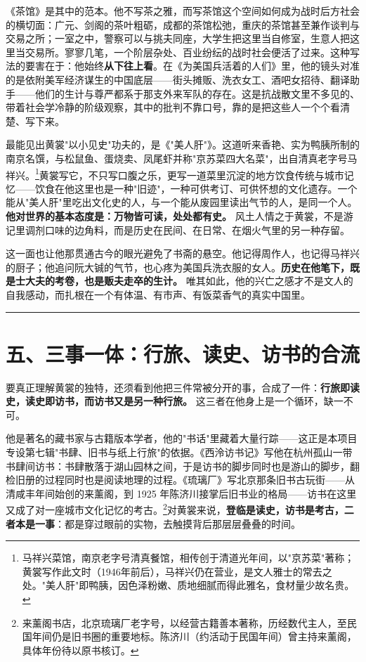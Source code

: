 \documentclass[UTF8,fontset=none,zihao=-4,a4paper]{ctexart}
\begin{document}
《茶馆》是其中的范本。他不写茶之雅，而写茶馆这个空间如何成为战时后方社会的横切面：广元、剑阁的茶叶粗砺，成都的茶馆松弛，重庆的茶馆甚至兼作谈判与交易之所；一室之中，警察可以与挑夫同座，大学生把这里当自修室，生意人把这里当交易所。寥寥几笔，一个阶层杂处、百业纷纭的战时社会便活了过来。这种写法的要害在于：他始终\textbf{从下往上看}。在《为美国兵活着的人们》里，他的镜头对准的是依附美军经济谋生的中国底层——街头摊贩、洗衣女工、酒吧女招待、翻译助手——他们的生计与尊严都系于那支外来军队的存在。这是抗战散文里不多见的、带着社会学冷静的阶级观察，其中的批判不靠口号，靠的是把这些人一个个看清楚、写下来。


最能见出黄裳"以小见史"功夫的，是《"美人肝"》。这道听来香艳、实为鸭胰所制的南京名馔，与松鼠鱼、蛋烧卖、凤尾虾并称"京苏菜四大名菜"，出自清真老字号马祥兴。\footnote{马祥兴菜馆，南京老字号清真餐馆，相传创于清道光年间，以"京苏菜"著称；黄裳写作此文时（1946年前后），马祥兴仍在营业，是文人雅士的常去之处。"美人肝"即鸭胰，因色泽粉嫩、质地细腻而得此雅名，食材量少故名贵。}黄裳写它，不只写口腹之乐，更写一道菜里沉淀的地方饮食传统与城市记忆——饮食在他这里也是一种"旧迹"，一种可供考订、可供怀想的文化遗存。一个能从"美人肝"里吃出文化史的人，与一个能从废园里读出气节的人，是同一个人。\textbf{他对世界的基本态度是：万物皆可读，处处都有史。} 风土人情之于黄裳，不是游记里调剂口味的边角料，而是历史在民间、在日常、在烟火气里的另一种存留。


这一面也让他那贯通古今的眼光避免了书斋的悬空。他记得周作人，也记得马祥兴的厨子；他追问阮大铖的气节，也心疼为美国兵洗衣服的女人。\textbf{历史在他笔下，既是士大夫的考卷，也是贩夫走卒的生计。} 唯其如此，他的兴亡之感才不是文人的自我感动，而扎根在一个有体温、有市声、有饭菜香气的真实中国里。


\medskip\hrule\medskip

\section{五、三事一体：行旅、读史、访书的合流}


要真正理解黄裳的独特，还须看到他把三件常被分开的事，合成了一件：\textbf{行旅即读史，读史即访书，而访书又是另一种行旅。} 这三者在他身上是一个循环，缺一不可。


他是著名的藏书家与古籍版本学者，他的"书话"里藏着大量行踪——这正是本项目专设第七辑"书肆、旧书与纸上行旅"的依据。《西泠访书记》写他在杭州孤山一带书肆间访书：书肆散落于湖山园林之间，于是访书的脚步同时也是游山的脚步，翻检旧册的过程同时也是阅读地理的过程。《琉璃厂》写北京那条旧书古玩街——从清咸丰年间始创的来薰阁，到 1925 年陈济川接掌后旧书业的格局——访书在这里又成了对一座城市文化记忆的考古。\footnote{来薰阁书店，北京琉璃厂老字号，以经营古籍善本著称，历经数代主人，至民国年间仍是旧书圈的重要地标。陈济川（约活动于民国年间）曾主持来薰阁，具体年份待以原书核订。}对黄裳来说，\textbf{登临是读史，访书是考古，二者本是一事}：都是穿过眼前的实物，去触摸背后那层层叠叠的时间。
\end{document}
